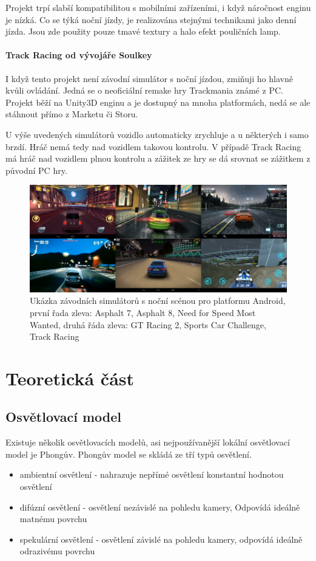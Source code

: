 \documentclass[11pt,twoside,a4paper]{book}
\begin{document}
Projekt trpí slabší kompatibilitou s mobilními zařízeními, i když náročnost enginu je nízká. Co se týká noční jízdy, je realizována stejnými technikami jako denní jízda. Jsou zde použity pouze tmavé textury a halo efekt pouličních lamp.

\subsubsection{Track Racing od vývojáře Soulkey}
I když tento projekt není závodní simulátor s noční jízdou, zmiňuji ho hlavně kvůli ovládání. Jedná se o neoficiální remake hry Trackmania známé z PC. Projekt běží na Unity3D enginu a je dostupný na mnoha platformách, nedá se ale stáhnout přímo z Marketu či Storu.

U výše uvedených simulátorů vozidlo automaticky zrychluje a u některých i samo brzdí. Hráč nemá tedy nad vozidlem takovou kontrolu. V případě Track Racing má hráč nad vozidlem plnou kontrolu a zážitek ze hry se dá srovnat se zážitkem z původní PC hry.
\newpage

\begin{center}
\begin{figure}[h!]
\includegraphics[width=150mm]{figures/games.png}
\caption{Ukázka závodních simulátorů s noční scénou pro platformu Android, první řada zleva: Asphalt 7, Asphalt 8, Need for Speed Most Wanted, druhá řáda zleva: GT Racing 2, Sports Car Challenge, Track Racing}
\end{figure}
\end{center}

\chapter{Teoretická část}

\section{Osvětlovací model}
Existuje několik osvětlovacích modelů, asi nejpoužívanější lokální osvětlovací model je Phongův. Phongův model se skládá ze tří typů osvětlení.
\begin{itemize}
\item ambientní osvětlení - nahrazuje nepřímé osvětlení konstantní hodnotou osvětlení
\item difúzní osvětlení - osvětlení nezávislé na pohledu kamery, Odpovídá ideálně matnému povrchu
\item spekulární osvětlení - osvětlení závislé na pohledu kamery, odpovídá ideálně odrazivému povrchu
\end{itemize}
\end{document}
